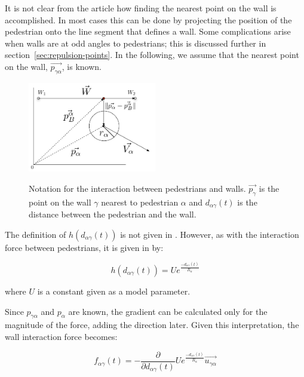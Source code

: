 It is not clear from the article how finding the nearest point on the wall is 
accomplished. In most cases this can be done by projecting the position of the 
pedestrian onto the line segment that defines a wall. Some complications 
arise when walls are at odd angles to pedestrians; this is discussed further 
in section~\ref{sec:repulsion-points}. In the following, we assume that the 
nearest point on the wall, $\overrightarrow{p_{\gamma \alpha}}$, is known.

\begin{figure}[ht]
    \centering
    {\includegraphics[width=0.5\textwidth]{Figures/NotationOfWall.pdf}} 
    \caption[Notation for the interaction between pedestrians and 
    walls]{Notation for the interaction between pedestrians and walls.  
    $\overrightarrow{p_\gamma}$ is the point on the wall $\gamma$ nearest to 
    pedestrian $\alpha$ and  $d_{\alpha \gamma}(t)$ is the distance between 
    the pedestrian and the wall.}
    \label{fig:wall-notation}
\end{figure}

The definition of $h\left( d_{\alpha \gamma}(t) \right)$ is not given in 
\cite{self-org}. However, as with the interaction force between pedestrians, 
it is given in \cite{ABconstant} by: 

\begin{equation}
    h \left( d_{\alpha \gamma}(t) \right) =
    U e^{\frac{- d_{\alpha \gamma}(t) }{ R_{\alpha} }}
\end{equation}

where $U$ is a constant given as a model parameter.

Since $p_{\gamma \alpha}$ and $p_\alpha$ are known, the gradient can be 
calculated only for the magnitude of the force, adding the direction later. 
Given this interpretation, the wall interaction force becomes:


\begin{equation}
    f_{\alpha \gamma}(t) =
    -\frac{\partial}{\partial d_{\alpha \gamma}(t)}U e^{\frac{- d_{\alpha 
    \gamma}(t) }{ R_{\alpha} }} \overrightarrow{u_{\gamma \alpha}}
\end{equation}

